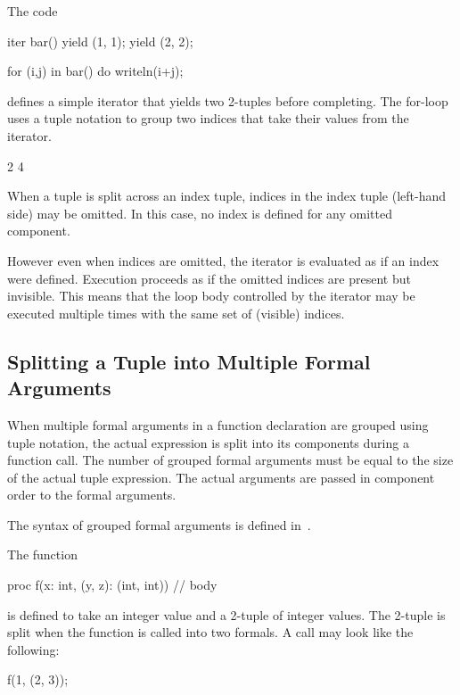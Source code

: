 \begin{example}
\begin{chapelpre}
\end{chapelpre}
The code
\begin{chapel}
iter bar() {
  yield (1, 1);
  yield (2, 2);
}

for (i,j) in bar() do
  writeln(i+j);
\end{chapel}
defines a simple iterator that yields two 2-tuples before completing.
The for-loop uses a tuple notation to group two indices that take
their values from the iterator.
\begin{chapelpost}
\end{chapelpost}
\begin{chapeloutput}
2
4
\end{chapeloutput}
\end{example}

When a tuple is split across an index tuple, indices in the index
tuple (left-hand side) may be omitted.  In this case, no index is
defined for any omitted component.  

However even when indices are omitted, the iterator is
evaluated as if an index were defined.  Execution proceeds as if the
omitted indices are present but invisible.  This means that the loop body
controlled by the iterator may be executed multiple times with the
same set of (visible) indices.

\subsection{Splitting a Tuple into Multiple Formal Arguments}
\label{Formal_Argument_Declarations_in_a_Tuple}

When multiple formal arguments in a function declaration are grouped
using tuple notation, the actual expression is split into its
components during a function call.  The number of grouped formal
arguments must be equal to the size of the actual tuple expression.
The actual arguments are passed in component order to the formal
arguments.

The syntax of grouped formal arguments is defined
in~.

\begin{example}
\begin{chapelpre}
\end{chapelpre}
The function
\begin{chapel}
proc f(x: int, (y, z): (int, int)) {
  // body
}
\end{chapel}
is defined to take an integer value and a 2-tuple of integer values.
The 2-tuple is split when the function is called into two formals.  A
call may look like the following:
\begin{chapel}
f(1, (2, 3));
\end{chapel}
\begin{chapelpost}
\end{chapelpost}
\begin{chapeloutput}
\end{chapeloutput}
\end{example}

